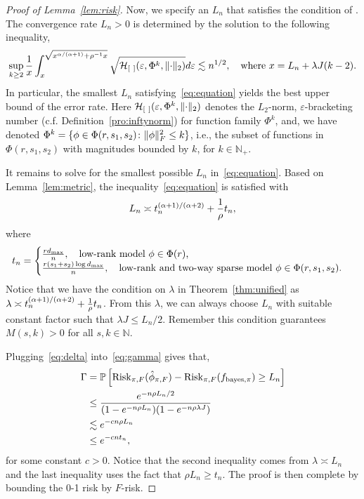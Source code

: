 \documentclass[11pt]{article}
\theoremstyle{plain}
\theoremstyle{definition}
\def\bayespif{f_{\textup{bayes},\pi}}
\def\riskF{\textup{Risk}_{\pi,F}}
\begin{document}
\begin{proof}[Proof of Lemma~\ref{lem:risk}]
Now, we specify an  $L_n$ that satisfies the condition of \citet[Theorem 3]{shen1994convergence}. The convergence rate $L_n>0$ is determined by the solution to the following inequality,
\begin{equation}\label{eq:equation}
\sup_{k\geq 2}{1\over x}\int_{x}^{\sqrt{x^{\alpha/(\alpha+1)}+\rho^{-1}x}}\sqrt{\tH_{[\ ]}(\varepsilon, \Phi^{k},\vnormSize{}{\cdot})}d\varepsilon \lesssim n^{1/2}, \quad \text{where }x=L_n+\lambda J(k-2).
\end{equation}
In particular, the smallest $L_n$ satisfying~\eqref{eq:equation} yields the best upper bound of the error rate. Here $\tH_{[\ ]}(\varepsilon, \Phi^{k}, \vnormSize{}{\cdot})$ denotes the $L_2$-norm, $\varepsilon$-bracketing number (c.f. Definition~\ref{pro:inftynorm}) for function family $\Phi^{k}$, and, we have denoted $\Phi^{k}=\{\phi\in\Phi(r,s_1,s_2)\colon \lVert\phi\rVert_F^2\leq k\}$, i.e., the subset of functions in $\Phi(r,s_1,s_2)$ with magnitudes bounded by $k$, for $k\in\mathbb{N}_{+}$.

It remains to solve for the smallest possible $L_n$ in~\eqref{eq:equation}. Based on Lemma~\ref{lem:metric}, the inequality~\eqref{eq:equation} is satisfied with 
\begin{equation}\label{eq:delta}
L_n\asymp  t_n^{(\alpha+1)/(\alpha+2)}+{1\over \rho} t_n, 
\end{equation}
where
\[
t_n=\begin{cases}
{rd_{\max}\over n}, \quad \text{low-rank model $\phi\in\Phi(r)$,}\\
{r(s_1+s_2)\log d_{\max}\over n}, \quad \text{low-rank and two-way sparse model $\phi\in\Phi(r,s_1,s_2)$.}\\
\end{cases}
\]
Notice that we have the condition on $\lambda$ in  Theorem~\ref{thm:unified}  as $\lambda\asymp  t_n^{(\alpha+1)/(\alpha+2)}+{1\over \rho} t_n$. From this $\lambda$,  we can always choose $L_n$ with suitable constant factor such that $\lambda J\leq L_n/2$. Remember this condition guarantees $M(s,k)>0$ for all $s,k\in\mathbb{N}.$


Plugging~\eqref{eq:delta} into~\eqref{eq:gamma} gives that, 
\begin{align}\label{eq:tail}
\Gamma&=\mathbb{P}\left[\riskF(\hat \phi_{\pi,F}) - \riskF(\bayespif)  \geq L_n \right]\\&\leq{e^{-n\rho L_n/2}\over (1-e^{-n\rho L_n})(1-e^{-n\rho\lambda J})}\\
&\lesssim e^{-c n\rho L_n}\\
&\leq e^{-c n t_n}
,
\end{align}
for some constant $c>0$.
Notice that  the second inequality comes from  $\lambda \asymp L_n$ and  the last inequality uses the fact that $\rho L_n\geq t_n$. The proof is then complete by bounding the 0-1 risk by $F$-risk. 


\end{proof}
\end{document}
